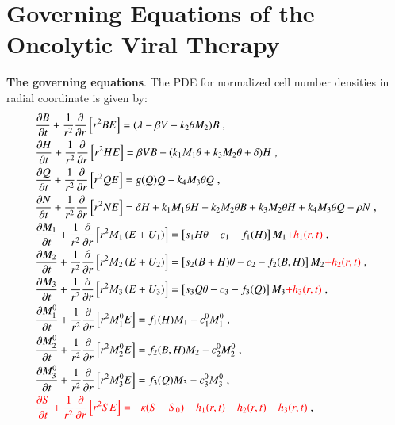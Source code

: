 \documentclass[reqno]{amsart}
\theoremstyle{definition}
\theoremstyle{remark}
\numberwithin{equation}{section}
\numberwithin{figure}{section}
\newcommand{\po}[1]{\frac{\partial}{\partial{#1}}}
\newcommand{\pp}[2]{\frac{\partial {#1}}{\partial {#2}}}
\begin{document}
\section{Governing Equations of the Oncolytic Viral Therapy}
\label{sec:eqn}
{\bf The governing equations}.
The PDE for normalized cell number densities in radial coordinate is given by:
\begin{subequations}\label{eq:eqn_pde_cell}
  \begin{align}
    \label{eq:eqn_pde_cell_b}
    &\pp{B}{t} + \frac{1}{r^2}\po{r}\left[r^2BE\right] = (\lambda - \beta V - k_2\theta M_2)B\;, \\
    \label{eq:eqn_pde_cell_h}
    &\pp{H}{t} + \frac{1}{r^2}\po{r}\left[r^2HE\right] = \beta V B - (k_1M_1\theta+k_3M_2\theta+\delta)H\;, \\
    \label{eq:eqn_pde_cell_q}
    &\pp{Q}{t} + \frac{1}{r^2}\po{r}\left[r^2QE\right] = g(Q)Q-k_4M_3\theta Q\;, \\
    \label{eq:eqn_pde_cell_n}
    &\pp{N}{t} + \frac{1}{r^2}\po{r}\left[r^2NE\right] = \delta H + k_1M_1\theta H + k_2M_2\theta B + k_3M_2\theta H + k_4M_3\theta Q - \rho N\;, \\
    \label{eq:eqn_pde_cell_m1}
    &\pp{M_1}{t} + \frac{1}{r^2}\po{r}\left[r^2M_1\left(E+U_1\right)\right] = \left[s_1H\theta-c_1-f_1(H)\right]M_1 {\color{red} + h_1(r,t)}\;, \\
    \label{eq:eqn_pde_cell_m2}
    &\pp{M_2}{t} + \frac{1}{r^2}\po{r}\left[r^2M_2\left(E+U_2\right)\right] = \left[s_2(B+H)\theta-c_2-f_2(B,H)\right]M_2 {\color{red} + h_2(r,t)}\;, \\
    \label{eq:eqn_pde_cell_m3}
    &\pp{M_3}{t} + \frac{1}{r^2}\po{r}\left[r^2M_3\left(E+U_3\right)\right] = \left[s_3Q\theta-c_3-f_3(Q)\right]M_3 {\color{red} + h_3(r,t)}\;, \\
    \label{eq:eqn_pde_cell_m1e}
    &\pp{M_1^0}{t} + \frac{1}{r^2}\po{r}\left[r^2M_1^0E\right] = f_1(H)M_1-c_1^0M_1^0\;, \\
    \label{eq:eqn_pde_cell_m2e}
    &\pp{M_2^0}{t} + \frac{1}{r^2}\po{r}\left[r^2M_2^0E\right] = f_2(B,H)M_2-c_2^0M_2^0\;, \\
    \label{eq:eqn_pde_cell_m3e}
    &\pp{M_3^0}{t} + \frac{1}{r^2}\po{r}\left[r^2M_3^0E\right] = f_3(Q)M_3-c_3^0M_3^0\;, \\
    \label{eq:eqn_pde_cell_s}
    &{\color{red}\pp{S}{t} + \frac{1}{r^2}\po{r}\left[r^2SE\right] = -\kappa(S-S_0) - h_1(r,t) - h_2(r,t) - h_3(r,t)}\;,
  \end{align}
\end{subequations}
\end{document}
